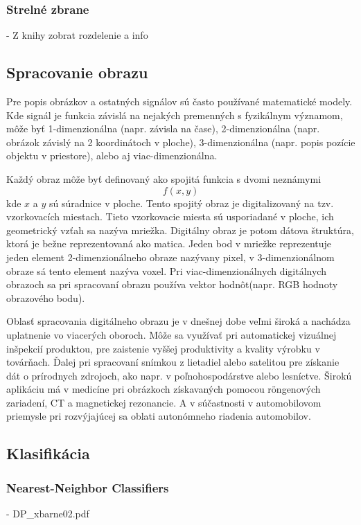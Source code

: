 \documentclass[10pt,a4paper]{article}
\begin{document}
\subsubsection{Strelné zbrane}
- Z knihy zobrat rozdelenie a info

\subsection{Spracovanie obrazu}
Pre popis obrázkov a ostatných signálov sú často používané matematické modely.
Kde signál je funkcia závislá na nejakých premenných s fyzikálnym významom, môže byť 1-dimenzionálna (napr. závisla na čase),
2-dimenzionálna (napr. obrázok závislý na 2 koordinátoch v ploche), 3-dimenzionálna (napr. popis pozície objektu v priestore), alebo aj viac-dimenzionálna\cite{book:ImageProcessing}.

    Každý obraz môže byť definovaný ako spojitá funkcia s dvomi neznámymi $$f(x,y)$$ kde $x$ a $y$ sú súradnice v ploche.
Tento spojitý obraz je digitalizovaný na tzv. vzorkovacích miestach.
Tieto vzorkovacie miesta sú usporiadané v ploche, ich geometrický vzťah sa nazýva mriežka.
Digitálny obraz je potom dátova štruktúra, ktorá je bežne reprezentovaná ako matica.
Jeden bod v mriežke reprezentuje jeden element 2-dimenzionálneho obraze nazývany pixel, v 3-dimenzionálnom obraze sá tento element nazýva voxel\cite{book:ImageProcessing}.
Pri viac-dimenzionálnych digitálnych obrazoch sa pri spracovaní obrazu používa vektor hodnôt(napr. RGB hodnoty obrazového bodu).

Oblasť spracovania digitálneho obrazu je v dnešnej dobe veľmi široká a nachádza uplatnenie vo viacerých oboroch.
Môže sa využívať pri automatickej vizuálnej inšpekcií produktou, pre zaistenie vyššej produktivity a kvality výrobku v továrňach.
Ďalej pri spracovaní snímkou z lietadiel alebo satelitou pre získanie dát o prírodnych zdrojoch, ako napr. v poľnohospodárstve alebo lesníctve.
Širokú aplikáciu má v medicíne pri obrázkoch získavaných pomocou röngenových zariadení, CT a magnetickej rezonancie\cite{book:ImageProcessingApplication}.
A v súčastnosti v automobilovom priemysle pri rozvýjajúcej sa oblati autonómneho riadenia automobilov.

\subsection{Klasifikácia}

\subsubsection{Nearest-Neighbor Classifiers}
- DP\_xbarne02.pdf
\end{document}
